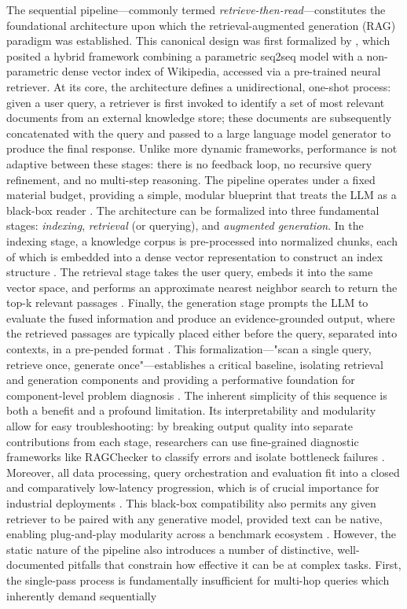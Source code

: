 \documentclass[11pt,a4paper]{article}
\begin{document}
The sequential pipeline---commonly termed \emph{retrieve-then-read}---constitutes the foundational architecture upon which the retrieval-augmented generation (RAG) paradigm was established. This canonical design was first formalized by \cite{arxiv:2005.11401v4}, which posited a hybrid framework combining a parametric seq2seq model with a non-parametric dense vector index of Wikipedia, accessed via a pre-trained neural retriever. At its core, the architecture defines a unidirectional, one-shot process: given a user query, a retriever is first invoked to identify a set of most relevant documents from an external knowledge store; these documents are subsequently concatenated with the query and passed to a large language model generator to produce the final response. Unlike more dynamic frameworks, performance is not adaptive between these stages: there is no feedback loop, no recursive query refinement, and no multi-step reasoning. The pipeline operates under a fixed material budget, providing a simple, modular blueprint that treats the LLM as a black-box reader \cite{arxiv:2301.12652v4}. The architecture can be formalized into three fundamental stages: \emph{indexing}, \emph{retrieval} (or querying), and \emph{augmented generation}. In the indexing stage, a knowledge corpus is pre-processed into normalized chunks, each of which is embedded into a dense vector representation to construct an index structure \cite{arxiv:2005.11401v4}. The retrieval stage takes the user query, embeds it into the same vector space, and performs an approximate nearest neighbor search to return the top-k relevant passages \cite{arxiv:2005.11401v4}. Finally, the generation stage prompts the LLM to evaluate the fused information and produce an evidence-grounded output, where the retrieved passages are typically placed either before the query, separated into contexts, in a pre-pended format \cite{arxiv:2301.12652v4,arxiv:2407.01219v1}. This formalization---"scan a single query, retrieve once, generate once"---establishes a critical baseline, isolating retrieval and generation components and providing a performative foundation for component-level problem diagnosis \cite{arxiv:2503.18016v1,arxiv:2404.10981v1}. The inherent simplicity of this sequence is both a benefit and a profound limitation. Its interpretability and modularity allow for easy troubleshooting: by breaking output quality into separate contributions from each stage, researchers can use fine-grained diagnostic frameworks like RAGChecker to classify errors and isolate bottleneck failures \cite{arxiv:2408.08067v2}. Moreover, all data processing, query orchestration and evaluation fit into a closed and comparatively low-latency progression, which is of crucial importance for industrial deployments \cite{arxiv:2602.03368v2}. This black-box compatibility also permits any given retriever to be paired with any generative model, provided text can be native, enabling plug-and-play modularity across a benchmark ecosystem \cite{arxiv:2301.12652v4,arxiv:2404.19543v1}. However, the static nature of the pipeline also introduces a number of distinctive, well-documented pitfalls that constrain how effective it can be at complex tasks. First, the single-pass process is fundamentally insufficient for multi-hop queries which inherently demand sequentially 
\end{document}
